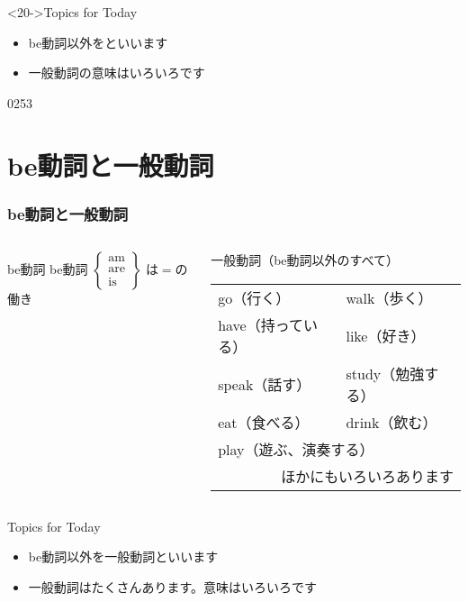 \documentclass[aspectratio=169,xcolor={dvipsnames,table}]{beamer}
\newcommand{\myaudio}[1]{\href{#1}{\faVolumeUp}}
\begin{document}
\begin{frame}[plain,label=is_verb]
\bigskip

\begin{block}<20->{Topics for Today}
\begin{itemize}[square]
 \item  {be動詞以外をといいます}
 \item<27-> {一般動詞の意味はいろいろです}
\end{itemize}
      \end{block}



\hfill{\tiny 0253}\,\scriptsize \myaudio{./audio/004_verb_01.mp3}

\end{frame}
\section{be動詞と一般動詞}
\begin{frame}[plain,label=point1]\frametitle{be動詞と一般動詞}

\begin{columns}
\begin{column}[t]{.38\textwidth}
\begin{exampleblock}{be動詞}
be動詞
{\footnotesize
$
 \left\{
\begin{array}{l}
\text{am}\\
\text{are}\\
\text{is}
\end{array}\right\}
$
}
は$=$の働き
\end{exampleblock}
\end{column}
\pause
\begin{column}[t]{.52\textwidth}
\begin{alertblock}{一般動詞（be動詞以外のすべて）}
\pause
\begin{tabular}[t]{ll}
go（行く）&walk（歩く）\pause\\
have（持っている）&like（好き）\pause\\
speak（話す）&study（勉強する）\pause\\
eat（食べる）& drink（飲む）\pause\\
\multicolumn{2}{l}{play（遊ぶ、演奏する）\pause}\\
\multicolumn{2}{r}{ほかにもいろいろあります}\\
\end{tabular}
\end{alertblock}
\end{column}
\end{columns}


\bigskip
\pause
\begin{block}{Topics for Today}
\begin{itemize}[<+- |alert@+>][square]
 \item  be動詞以外を一般動詞といいます
 \item 一般動詞はたくさんあります。意味はいろいろです
\end{itemize}
     \end{block}

\end{frame}
\end{document}
